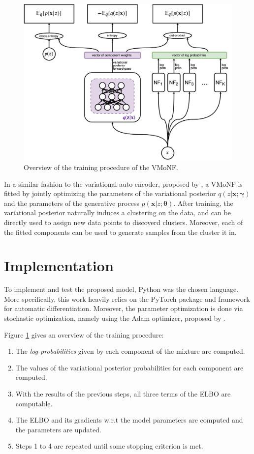 \begin{figure}[!htb]
  \centering
  \includegraphics[width=0.85\linewidth]{figures/train_overview.png}
  \caption{Overview of the training procedure of the VMoNF.}
  \label{fig:modeloverview}
\end{figure}

In a similar fashion to the variational auto-encoder, proposed by \textcite{vaepaper},
a VMoNF is fitted by jointly optimizing the parameters of the variational
posterior $q(z|\bm{x}; \bm\gamma)$ and the parameters of the generative process
$p(\bm{x}|z; \bm\theta)$.
After training, the variational posterior naturally induces a clustering on
the data, and can be directly used to assign new data points to discoverd clusters.
Moreover, each of the fitted components can be used to generate samples from the
cluster it  in.

\section{Implementation}

To implement and test the proposed model, Python was the chosen language. More
specifically, this work heavily relies on the PyTorch \autocite{pytorch} package
and framework for automatic differentiation. Moreover, the parameter optimization
is done via stochastic optimization, namely using the Adam optimizer, proposed by
\textcite{adam}.

Figure \ref{fig:modeloverview} gives an overview of the training procedure:
\begin{enumerate}
    \item The \emph{log-probabilities} given by each component of the mixture
    are computed.
    \item The values of the variational posterior probabilities for each
    component are computed.
    \item With the results of the previous steps, all three terms of the ELBO
    are computable.
    \item The ELBO and its gradients w.r.t the model parameters are computed
    and the parameters are updated.
    \item Steps 1 to 4 are repeated until some stopping criterion is met.
\end{enumerate}

